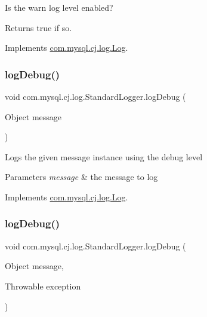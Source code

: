 Is the \textquotesingle{}warn\textquotesingle{} log level enabled?

\begin{DoxyReturn}{Returns}
true if so. 
\end{DoxyReturn}


Implements \mbox{\hyperlink{interfacecom_1_1mysql_1_1cj_1_1log_1_1_log_a7877db04f22a78b801a8f2f8989d7043}{com.\+mysql.\+cj.\+log.\+Log}}.

\mbox{\label{classcom_1_1mysql_1_1cj_1_1log_1_1_standard_logger_a99571fed95c82bb8356f213c3a4b0fa8}} 
\subsubsection{\texorpdfstring{log\+Debug()}{logDebug()}\hspace{0.1cm}{\footnotesize\ttfamily [1/2]}}
{\footnotesize\ttfamily void com.\+mysql.\+cj.\+log.\+Standard\+Logger.\+log\+Debug (\begin{DoxyParamCaption}\item[{Object}]{message }\end{DoxyParamCaption})}

Logs the given message instance using the \textquotesingle{}debug\textquotesingle{} level


\begin{DoxyParams}{Parameters}
{\em message} & the message to log \\
\hline
\end{DoxyParams}


Implements \mbox{\hyperlink{interfacecom_1_1mysql_1_1cj_1_1log_1_1_log_a6149f715730ea0615ef6e341dd3e8a39}{com.\+mysql.\+cj.\+log.\+Log}}.

\mbox{\label{classcom_1_1mysql_1_1cj_1_1log_1_1_standard_logger_a8f641c61351e0b4242bc14c49d72f603}} 
\subsubsection{\texorpdfstring{log\+Debug()}{logDebug()}\hspace{0.1cm}{\footnotesize\ttfamily [2/2]}}
{\footnotesize\ttfamily void com.\+mysql.\+cj.\+log.\+Standard\+Logger.\+log\+Debug (\begin{DoxyParamCaption}\item[{Object}]{message,  }\item[{Throwable}]{exception }\end{DoxyParamCaption})}

